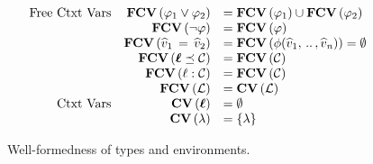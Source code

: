 \begin{figure}[t]
  \[
    \begin{array}{rrl}
      \text{Free Ctxt Vars} & \mathbf{FCV} \, \ottsym{(}  \varphi_{{\mathrm{1}}}  \vee  \varphi_{{\mathrm{2}}}  \ottsym{)} & =  \mathbf{FCV} \, \ottsym{(}  \varphi_{{\mathrm{1}}}  \ottsym{)}  \cup  \mathbf{FCV} \, \ottsym{(}  \varphi_{{\mathrm{2}}}  \ottsym{)}  \\
                            & \mathbf{FCV} \, \ottsym{(}   \neg  \varphi   \ottsym{)} & = \mathbf{FCV} \, \ottsym{(}  \varphi  \ottsym{)} \\
                            & \mathbf{FCV} \, \ottsym{(}  \widehat{v}_{{\mathrm{1}}} \, \ottsym{=} \, \widehat{v}_{{\mathrm{2}}}  \ottsym{)} & = \mathbf{FCV} \, \ottsym{(}  \phi  \ottsym{(}  \widehat{v}_{{\mathrm{1}}}  \ottsym{,} \, .. \, \ottsym{,}  \widehat{v}_{\ottmv{n}}  \ottsym{)}  \ottsym{)}  \ottsym{=}   \emptyset  \\
                            & \mathbf{FCV} \, \ottsym{(}    \oldvec{\ell}     \preceq    \mathcal{C}   \ottsym{)} & = \mathbf{FCV} \, \ottsym{(}  \mathcal{C}  \ottsym{)} \\
                            & \mathbf{FCV} \, \ottsym{(}   \ell  :  \mathcal{C}   \ottsym{)} & = \mathbf{FCV} \, \ottsym{(}  \mathcal{C}  \ottsym{)} \\
                            & \mathbf{FCV} \, \ottsym{(}  \mathcal{L}  \ottsym{)} & = \ottkw{CV} \, \ottsym{(}  \mathcal{L}  \ottsym{)} \\
      \text{Ctxt Vars} & \ottkw{CV} \, \ottsym{(}  \oldvec{\ell}  \ottsym{)} & =  \emptyset  \\
                            & \ottkw{CV} \, \ottsym{(}  \lambda  \ottsym{)} & =  \set{ \lambda } 
    \end{array}
  \]
\caption{Well-formedness of types and environments. }
  \label{fig:type-wf}
\end{figure}
